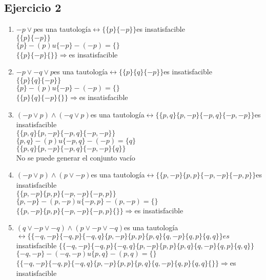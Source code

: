 \documentclass[10pt,a4paper]{article}
\begin{document}
  \subsection{Ejercicio 2}
    \begin{enumerate}
    \item $-p \vee p $es una tautología$  \leftrightarrow \{\{p\} \{-p\}\} $es insatisfacible \\
    $\{\{p\} \{-p\}\}$ \\
    $\{p\}-(p)u\{-p\}-(-p)=\{\}$ \\
    $\{\{p\} \{-p\} \{\}\} \Rightarrow $es insatisfacible
    \item $-p \vee -q \vee p $es una tautología$ \leftrightarrow \{\{p\} \{q\} \{-p\}\} $es insatisfacible \\
    $\{\{p\} \{q\} \{-p\}\}$ \\
    $\{p\}-(p)u\{-p\}-(-p)=\{\}$ \\
    $\{\{p\} \{q\} \{-p\} \{\}\} \Rightarrow $es insatisfacible
    \item $(-p \vee p)\wedge(-q \vee p) $es una tautología$ \leftrightarrow \{\{p, q\} \{p, -p\} \{-p, q\} \{-p, -p\}\} $es insatisfacible \\
    $\{\{p, q\} \{p, -p\} \{-p, q\} \{-p, -p\}\}$ \\
    $\{p, q\}-(p)u\{-p, q\}-(-p)=\{q\}$ \\
    $\{\{p, q\} \{p, -p\} \{-p, q\} \{-p, -p\} \{q\}\}$ \\
    No se puede generar el conjunto vacío
    \item $(-p \vee p)\wedge(p \vee -p) $es una tautología$ \leftrightarrow \{\{p, -p\} \{p, p\} \{-p, -p\} \{-p, p\}\} $es insatisfacible \\
    $\{\{p, -p\} \{p, p\} \{-p, -p\} \{-p, p\}\}$ \\
    $\{p, -p\}-(p,-p)u\{-p, p\}-(p,-p)=\{\}$ \\
    $\{\{p, -p\} \{p, p\} \{-p, -p\} \{-p, p\} \{\}\} \Rightarrow $es insatisfacible
    \item $(q \vee -p \vee -q)\wedge(p \vee -p \vee -q) $es una tautología$ \leftrightarrow \{\{-q, -p\} \{-q, p\} \{-q, q\} \{p, -p\} \{p, p\} \{p, q\} \{q, -p\} \{q, p\} \{q, q\}\} es$ insatisfacible
    $\{\{-q, -p\} \{-q, p\} \{-q, q\} \{p, -p\} \{p, p\} \{p, q\} \{q, -p\} \{q, p\} \{q, q\}\}$ \\
    $\{-q, -p\}-(-q, -p)u\{p, q\}-(p, q)=\{\}$ \\
    $\{\{-q, -p\} \{-q, p\} \{-q, q\} \{p, -p\} \{p, p\} \{p, q\} \{q, -p\} \{q, p\} \{q, q\} \{\}\} \Rightarrow $es insatisfacible

\end{enumerate}
\end{document}
